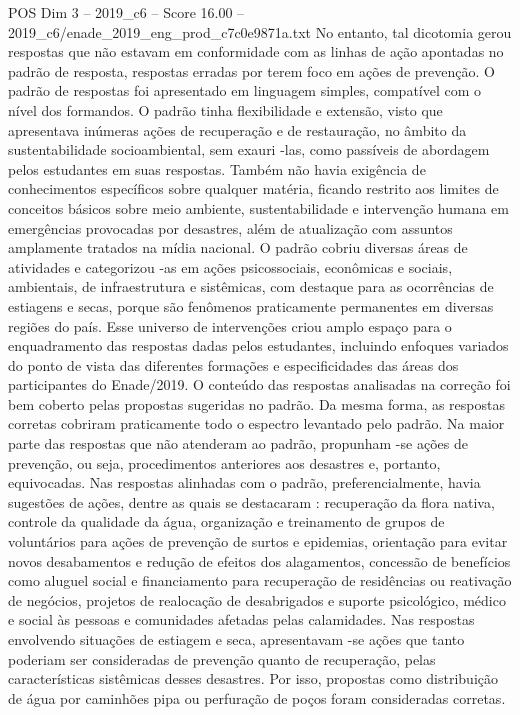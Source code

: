 \begin{textsample}{POS Dim 3 – 2019\_c6 – Score 16.00 – 2019\_c6/enade\_2019\_eng\_prod\_c7c0e9871a.txt}
No entanto, tal dicotomia gerou respostas que não estavam em conformidade com as linhas de ação apontadas no padrão de resposta, respostas erradas por terem foco em ações de prevenção.
O padrão de respostas foi apresentado em linguagem simples, compatível com o nível dos formandos.
O padrão tinha flexibilidade e extensão, visto que apresentava inúmeras ações de recuperação e de restauração, no âmbito da sustentabilidade socioambiental, sem exauri -las, como passíveis de abordagem pelos estudantes em suas respostas.
Também não havia exigência de conhecimentos específicos sobre qualquer matéria, ficando restrito aos limites de conceitos básicos sobre meio ambiente, sustentabilidade e intervenção humana em emergências provocadas por desastres, além de atualização com assuntos amplamente tratados na mídia nacional.
O padrão cobriu diversas áreas de atividades e categorizou -as em ações psicossociais, econômicas e sociais, ambientais, de infraestrutura e sistêmicas, com destaque para as ocorrências de estiagens e secas, porque são fenômenos praticamente permanentes em diversas regiões do país.
Esse universo de intervenções criou amplo espaço para o enquadramento das respostas dadas pelos estudantes, incluindo enfoques variados do ponto de vista das diferentes formações e especificidades das áreas dos participantes do Enade/2019.
O conteúdo das respostas analisadas na correção foi bem coberto pelas propostas sugeridas no padrão.
Da mesma forma, as respostas corretas cobriram praticamente todo o espectro levantado pelo padrão.
Na maior parte das respostas que não atenderam ao padrão, propunham -se ações de prevenção, ou seja, procedimentos anteriores aos desastres e, portanto, equivocadas.
Nas respostas alinhadas com o padrão, preferencialmente, havia sugestões de ações, dentre as quais se destacaram : recuperação da flora nativa, controle da qualidade da água, organização e treinamento de grupos de voluntários para ações de prevenção de surtos e epidemias, orientação para evitar novos desabamentos e redução de efeitos dos alagamentos, concessão de benefícios como aluguel social e financiamento para recuperação de residências ou reativação de negócios, projetos de realocação de desabrigados e suporte psicológico, médico e social às pessoas e comunidades afetadas pelas calamidades.
Nas respostas envolvendo situações de estiagem e seca, apresentavam -se ações que tanto poderiam ser consideradas de prevenção quanto de recuperação, pelas características sistêmicas desses desastres.
Por isso, propostas como distribuição de água por caminhões pipa ou perfuração de poços foram consideradas corretas.

\end{textsample}
